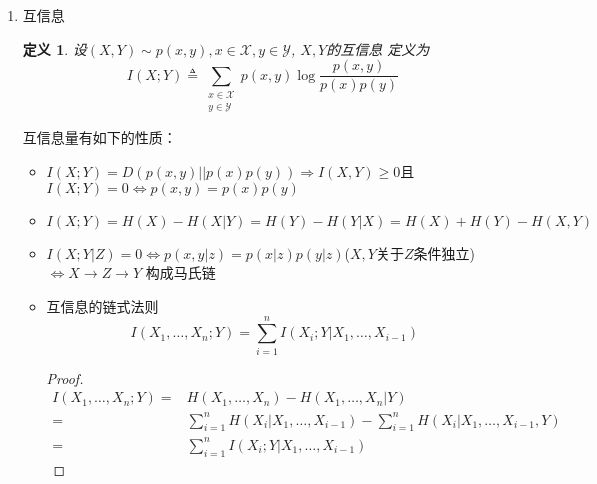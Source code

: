 \documentclass{article}
\newtheorem{definition}{定义}
\begin{document}
\begin{enumerate}
相对熵$D(p||q)$的下凸性可以总结为以下三点：
\begin{itemize}
\item $q$固定，由 $t\log t$的下凸性可以得到
$$
D(\lambda p+(1-\lambda)p'||q)\leq \lambda D(p||q)+(1-\lambda)D(p'||q) 
$$
\item $p$固定，由 $-\log t$的下凸性可以得到
$$
D(p||\lambda q+(1-\lambda)q')\leq \lambda D(p||q)+(1-\lambda)D(p||q') 
$$
\item 二元凸性
$$
D(\lambda p+(1-\lambda)p'||\lambda q+(1-\lambda)q')\leq \lambda D(p||q)+(1-\lambda)D(p'||q') 
$$
\begin{proof}
由对数和不等式
\begin{equation}
\sum_{i=1}^n a_i\log \frac{a_i}{b_i} \geq (\sum_{i=1}^n a_i)\log \frac{\sum_{i=1}^n a_i}{\sum_{i=1}^n b_i}
\end{equation}
\begin{align*}
D(\lambda p+(1-\lambda)p'||\lambda q+(1-\lambda)q') = & \sum_{x\in \mathcal{X}} (\lambda p(x)+(1-\lambda)p'(x))\log \frac{\lambda p(x)+(1-\lambda)p'(x)}{\lambda q(x)+(1-\lambda)q'(x)}\\
\leq & \sum_{x\in \mathcal{X}} [\lambda p(x)\log \frac{p(x)}{q(x)}+(1-\lambda) p'(x)\log \frac{p'(x)}{q'(x)}]\\
=& \lambda D(p||q) + (1-\lambda)D(p'||q')
\end{align*}
\end{proof}
\end{itemize}
\item 互信息
\begin{definition}
设$(X,Y)\sim p(x,y),x\in \mathcal{X},y\in \mathcal{Y}$, $X,Y$的互信息
定义为
$$
I(X;Y)\triangleq \sum_{\substack{x\in \mathcal{X} \\ y\in \mathcal{Y}}} p(x,y)\log \frac{p(x,y)}{p(x)p(y)} 
$$
\end{definition}
互信息量有如下的性质：
\begin{itemize}
\item $I(X;Y)=D(p(x,y)||p(x)p(y))\Rightarrow I(X,Y)\geq 0$且 
$I(X;Y)=0 \iff p(x,y)=p(x)p(y)$
\item $I(X;Y)=H(X)-H(X|Y)=H(Y)-H(Y|X)=H(X)+H(Y)-H(X,Y)$
\item $I(X;Y|Z)=0 \iff p(x,y|z)=p(x|z)p(y|z)$($X,Y$关于$Z$条件独立)$\iff  X\rightarrow Z \rightarrow Y$ 构成马氏链
\item 互信息的链式法则
$$ I(X_1,\dots,X_n;Y)=\sum_{i=1}^n I(X_i;Y|X_1,\dots,X_{i-1})
$$
\begin{proof}
\begin{align*}
I(X_1,\dots,X_n;Y) = & H(X_1,\dots,X_n)- H (X_1,\dots,X_n | Y )\\
= & \sum_{i=1}^n H(X_i|X_1,\dots,X_{i-1})-\sum_{i=1}^n H(X_i|X_1,\dots, X_{i-1},Y)\\
= & \sum_{i=1}^n I(X_i;Y|X_1,\dots,X_{i-1})
\end{align*}
\end{proof}
\end{itemize}


\end{enumerate}
\end{document}
